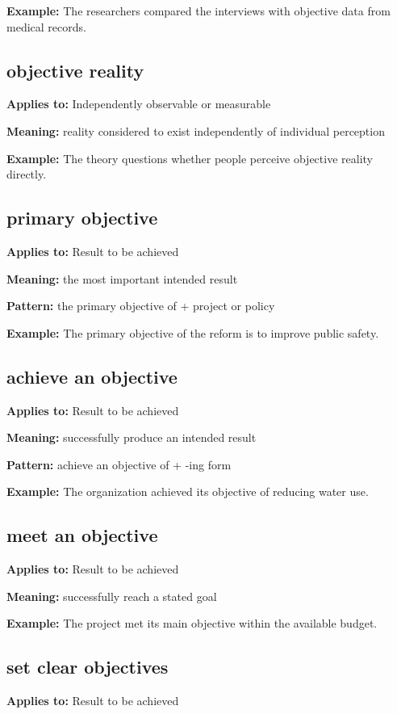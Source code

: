 \documentclass[11pt]{article}
\begin{document}
\textbf{Example:} The researchers compared the interviews with objective data from medical records.

\subsection{objective reality}
\textbf{Applies to:} Independently observable or measurable

\textbf{Meaning:} reality considered to exist independently of individual perception

\textbf{Example:} The theory questions whether people perceive objective reality directly.

\subsection{primary objective}
\textbf{Applies to:} Result to be achieved

\textbf{Meaning:} the most important intended result

\textbf{Pattern:} the primary objective of + project or policy

\textbf{Example:} The primary objective of the reform is to improve public safety.

\subsection{achieve an objective}
\textbf{Applies to:} Result to be achieved

\textbf{Meaning:} successfully produce an intended result

\textbf{Pattern:} achieve an objective of + -ing form

\textbf{Example:} The organization achieved its objective of reducing water use.

\subsection{meet an objective}
\textbf{Applies to:} Result to be achieved

\textbf{Meaning:} successfully reach a stated goal

\textbf{Example:} The project met its main objective within the available budget.

\subsection{set clear objectives}
\textbf{Applies to:} Result to be achieved
\end{document}
